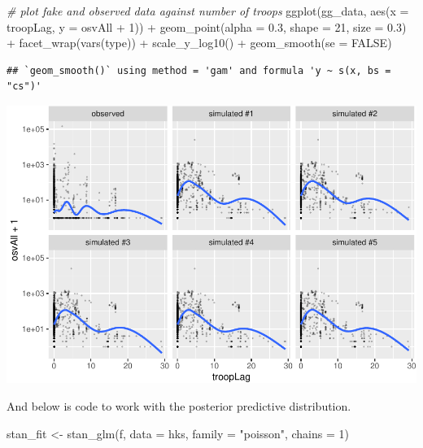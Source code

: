 \documentclass[
]{book}
\newenvironment{Shaded}{\begin{snugshade}}{\end{snugshade}}
\newcommand{\AttributeTok}[1]{\textcolor[rgb]{0.77,0.63,0.00}{#1}}
\newcommand{\CommentTok}[1]{\textcolor[rgb]{0.56,0.35,0.01}{\textit{#1}}}
\newcommand{\ConstantTok}[1]{\textcolor[rgb]{0.00,0.00,0.00}{#1}}
\newcommand{\DecValTok}[1]{\textcolor[rgb]{0.00,0.00,0.81}{#1}}
\newcommand{\FloatTok}[1]{\textcolor[rgb]{0.00,0.00,0.81}{#1}}
\newcommand{\FunctionTok}[1]{\textcolor[rgb]{0.00,0.00,0.00}{#1}}
\newcommand{\NormalTok}[1]{#1}
\newcommand{\OtherTok}[1]{\textcolor[rgb]{0.56,0.35,0.01}{#1}}
\newcommand{\SpecialCharTok}[1]{\textcolor[rgb]{0.00,0.00,0.00}{#1}}
\newcommand{\StringTok}[1]{\textcolor[rgb]{0.31,0.60,0.02}{#1}}
\begin{document}
\begin{Shaded}
\begin{Highlighting}[]
\CommentTok{\# plot fake and observed data against number of troops}
\FunctionTok{ggplot}\NormalTok{(gg\_data, }\FunctionTok{aes}\NormalTok{(}\AttributeTok{x =}\NormalTok{ troopLag, }\AttributeTok{y =}\NormalTok{ osvAll }\SpecialCharTok{+} \DecValTok{1}\NormalTok{)) }\SpecialCharTok{+} 
  \FunctionTok{geom\_point}\NormalTok{(}\AttributeTok{alpha =} \FloatTok{0.3}\NormalTok{, }\AttributeTok{shape =} \DecValTok{21}\NormalTok{, }\AttributeTok{size =} \FloatTok{0.3}\NormalTok{) }\SpecialCharTok{+} 
  \FunctionTok{facet\_wrap}\NormalTok{(}\FunctionTok{vars}\NormalTok{(type)) }\SpecialCharTok{+} 
  \FunctionTok{scale\_y\_log10}\NormalTok{() }\SpecialCharTok{+} 
  \FunctionTok{geom\_smooth}\NormalTok{(}\AttributeTok{se =} \ConstantTok{FALSE}\NormalTok{)}
\end{Highlighting}
\end{Shaded}

\begin{verbatim}
## `geom_smooth()` using method = 'gam' and formula 'y ~ s(x, bs = "cs")'
\end{verbatim}

\includegraphics{03-04-predictive-distributions_files/figure-latex/unnamed-chunk-6-2.pdf}

And below is code to work with the posterior predictive distribution.

\begin{Shaded}
\begin{Highlighting}[]
\NormalTok{stan\_fit }\OtherTok{\textless{}{-}} \FunctionTok{stan\_glm}\NormalTok{(f, }\AttributeTok{data =}\NormalTok{ hks, }\AttributeTok{family =} \StringTok{"poisson"}\NormalTok{, }\AttributeTok{chains =} \DecValTok{1}\NormalTok{)}
\end{Highlighting}
\end{Shaded}
\end{document}
